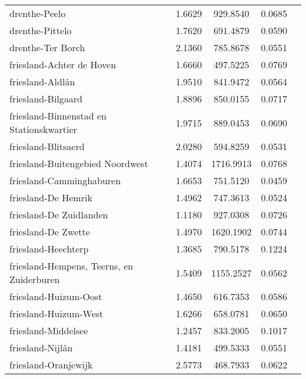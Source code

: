 \begin{longtable}{llccc}
	drenthe-Peelo                             & 1.6629  & 929.8540  & 0.0685                 \\
	drenthe-Pittelo                           & 1.7620  & 691.4879  & 0.0590                 \\
	drenthe-Ter Borch                         & 2.1360  & 785.8678  & 0.0551                 \\
	friesland-Achter de Hoven                 & 1.6660  & 497.5225  & 0.0769                 \\
	friesland-Aldlân                          & 1.9510  & 841.9472  & 0.0564                 \\
	friesland-Bilgaard                        & 1.8896  & 850.0155  & 0.0717                 \\
	friesland-Binnenstad en Stationskwartier  & 1.9715  & 889.0453  & 0.0690                 \\
	friesland-Blitsaerd                       & 2.0280  & 594.8259  & 0.0531                 \\
	friesland-Buitengebied Noordwest          & 1.4074  & 1716.9913 & 0.0768                 \\
	friesland-Camminghaburen                  & 1.6653  & 751.5120  & 0.0459                 \\
	friesland-De Hemrik                       & 1.4962  & 747.3613  & 0.0524                 \\
	friesland-De Zuidlanden                   & 1.1180  & 927.0308  & 0.0726                 \\
	friesland-De Zwette                       & 1.4970  & 1620.1902 & 0.0744                 \\
	friesland-Heechterp                       & 1.3685  & 790.5178  & 0.1224                 \\
	friesland-Hempens, Teerns, en Zuiderburen & 1.5409  & 1155.2527 & 0.0562                 \\
	friesland-Huizum-Oost                     & 1.4650  & 616.7353  & 0.0586                 \\
	friesland-Huizum-West                     & 1.6266  & 658.0781  & 0.0650                 \\
	friesland-Middelsee                       & 1.2457  & 833.2005  & 0.1017                 \\
	friesland-Nijlân                          & 1.4181  & 499.5333  & 0.0551                 \\
	friesland-Oranjewijk                      & 2.5773  & 468.7933  & 0.0622                 \\

\end{longtable}
